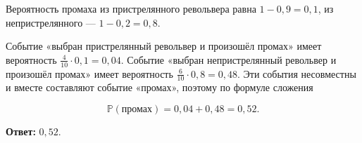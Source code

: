 \begin{solution}\label{solution-problem-solving-practice-homework-5}
Вероятность промаха из пристрелянного револьвера равна $1-0{,}9=0{,}1$, из непристрелянного — $1-0{,}2=0{,}8$.

Событие «выбран пристрелянный револьвер и произошёл промах» имеет вероятность $\frac4{10}\cdot0{,}1=0{,}04$. Событие «выбран непристрелянный револьвер и произошёл промах» имеет вероятность $\frac6{10}\cdot0{,}8=0{,}48$. Эти события несовместны и вместе составляют событие «промах», поэтому по формуле сложения

\[\mathbb P(\text{промах})=0{,}04+0{,}48=0{,}52.\]

\textbf{Ответ:} $0{,}52$.
\end{solution}


